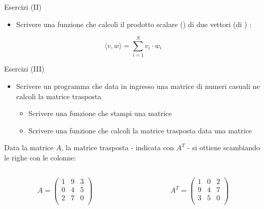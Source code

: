 \begin{frame}{Esercizi (II)}

  \begin{itemize}
   \item Scrivere una funzione che calcoli il prodotto scalare (\texttt{}) di due vettori 
   (di \texttt{}) :
  \end{itemize}

  \begin{equation}
    \langle  v, w \rangle = \sum_{i=1}^{N} v_i \cdot w_i
  \end{equation}

\end{frame}

\begin{frame}{Esercizi (III)}

  \begin{itemize}
    \item Scrivere un programma che data in ingresso una matrice di numeri casuali ne calcoli la matrice trasposta.
    \begin{itemize}
      \item Scrivere una funzione che stampi una matrice
      \item Scrivere una funzione che calcoli la matrice trasposta data una matrice
    \end{itemize}
  \end{itemize}

  Data la matrice $A$, la matrice trasposta - indicata con $A^T$ - si ottiene scambiando le righe con le colonne:
  \begin{columns}[T]
    \begin{column}[T]{5cm}
      \begin{equation*}
	A = \left(
	\begin{array}{ccc}
	  1 & 9 & 3 \\
	  0 & 4 & 5 \\
	  2 & 7 & 0 \\
	\end{array} \right)
      \end{equation*}      
    \end{column}
    \begin{column}[T]{5cm}
      \begin{equation*}
	  A^T = \left(
	  \begin{array}{ccc}
	    1 & 0 & 2 \\
	    9 & 4 & 7 \\
	    3 & 5 & 0 \\
	  \end{array} \right)
      \end{equation*}  
    \end{column}
  \end{columns}

\end{frame}

